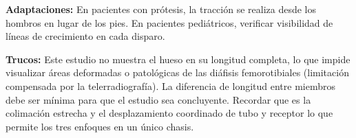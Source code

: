 	\textbf{Adaptaciones:} En pacientes con prótesis, la tracción se realiza desde los hombros en lugar de los pies. En pacientes pediátricos, verificar visibilidad de líneas de crecimiento en cada disparo.
	
	\textbf{Trucos:} Este estudio no muestra el hueso en su longitud completa, lo que impide visualizar áreas deformadas o patológicas de las diáfisis femorotibiales (limitación compensada por la telerradiografía). La diferencia de longitud entre miembros debe ser mínima para que el estudio sea concluyente. Recordar que es la colimación estrecha y el desplazamiento coordinado de tubo y receptor lo que permite los tres enfoques en un único chasis.
	
